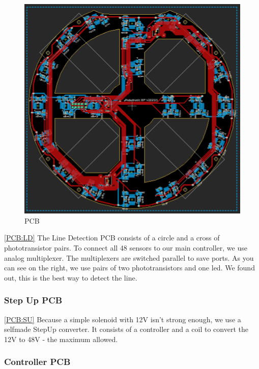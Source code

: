 \begin{figure}
    \centering
    \includegraphics[width=0.75\linewidth]{img/eagle/LineDedectionPCB.png}
    \caption{PCB}
    \label{fig:LDPCB}
\end{figure}

\ref{PCB:LD} The Line Detection PCB consists of a circle and a cross of phototransistor pairs. To connect all
48 sensors to our main controller, we use analog multiplexer. The multiplexers are switched parallel
to save ports.
\newline
As you can see on the right, we use pairs of two phototransistors and one led. We found out, this is the 
best way to detect the line.

\subsubsection{Step Up PCB}
\ref{PCB:SU} Because a simple solenoid with 12V isn't strong enough, we use a selfmade 
StepUp converter. It consists of a controller and a coil to convert the 12V
to 48V - the maximum allowed.
\newline

\subsubsection{Controller PCB}

